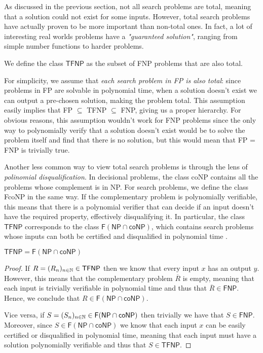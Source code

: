 As discussed in the previous section, not all search problems are total, meaning that a solution could not exist for some inputs. However, total search problems have actually proven to be more important than non-total ones. In fact, a lot of interesting real worlds problems have a \textit{"guaranteed solution"}, ranging from simple number functions to harder problems.

\begin{definition}
    We define the class $\mathsf{TFNP}$ as the subset of \textsf{FNP} problems that are also total.
\end{definition}

For simplicity, we assume that \textit{each search problem in \textsf{FP} is also total}: since problems in \textsf{FP} are solvable in polynomial time, when a solution doesn't exist we can output a pre-chosen  solution, making the problem total. This assumption easily implies that \textsf{FP} $\subseteq$ \textsf{TFNP} $\subseteq$ \textsf{FNP}, giving us a proper hierarchy. For obvious reasons, this assumption wouldn't work for \textsf{FNP} problems since the only way to polynomially verify that a solution doesn't exist would be to solve the problem itself and find that there is no solution, but this would mean that \textsf{FP} = \textsf{FNP} is trivially true.

Another less common way to view total search problems is through the lens of \textit{polinomial disqualification}. In decisional problems, the class \textsf{coNP} contains all the problems whose complement is in \textsf{NP}. For search problems, we define the class \textsf{FcoNP} in the same way. If the complementary problem is polynomially verifiable, this means that there is a polynomial verifier that can decide if an input doesn't have the required property, effectively disqualifying it. In particular, the class $\textsf{TFNP}$ corresponds to the class $\mathsf{F}(\mathsf{NP} \cap \mathsf{coNP})$, which contains search problems whose inputs can both be certified and disqualified in polynomial time \cite{tfnp_f_np_conp}.

\begin{theorem}
    \label{tfnp_f_np_conp}
    $\mathsf{TFNP} = \mathsf{F}(\mathsf{NP} \cap \mathsf{coNP})$
\end{theorem}

\begin{proof}
    If $R = (R_n)_{n \in \mathbb{N}} \in \textsf{TFNP}$ then we know that every input $x$ has an output $y$. However, this means that the complementary problem $\overline{R}$ is empty, meaning that each input is trivially verifiable in polynomial time and thus that $\overline{R} \in \textsf{FNP}$. Hence, we conclude that $R \in \mathsf{F}(\mathsf{NP} \cap \mathsf{coNP})$.
    
    Vice versa, if $S = (S_n)_{n \in \mathbb{N}} \in \mathsf{F}(\mathsf{NP} \cap \mathsf{coNP})$ then trivially we have that $S \in \mathsf{FNP}$. Moreover, since $S \in \mathsf{F}(\mathsf{NP} \cap \mathsf{coNP})$ we know that each input $x$ can be easily certified or disqualified in polynomial time, meaning that each input must have a solution polynomially verifiable and thus that $S \in \mathsf{TFNP}$.
\end{proof}

